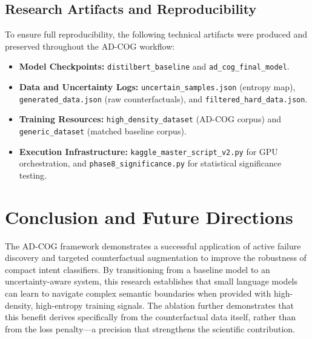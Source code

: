 \documentclass[11pt,a4paper]{article}
\begin{document}
\subsection{Research Artifacts and Reproducibility}
To ensure full reproducibility, the following technical artifacts were produced and preserved throughout the AD-COG workflow:
\begin{itemize}
    \item \textbf{Model Checkpoints:} \texttt{distilbert\_baseline} and \texttt{ad\_cog\_final\_model}.
    \item \textbf{Data and Uncertainty Logs:} \texttt{uncertain\_samples.json} (entropy map), \texttt{generated\_data.json} (raw counterfactuals), and \texttt{filtered\_hard\_data.json}.
    \item \textbf{Training Resources:} \texttt{high\_density\_dataset} (AD-COG corpus) and \texttt{generic\_dataset} (matched baseline corpus).
    \item \textbf{Execution Infrastructure:} \texttt{kaggle\_master\_script\_v2.py} for GPU orchestration, and \texttt{phase8\_significance.py} for statistical significance testing.
\end{itemize}

\section{Conclusion and Future Directions}

The AD-COG framework demonstrates a successful application of active failure discovery and targeted counterfactual augmentation to improve the robustness of compact intent classifiers. By transitioning from a baseline model to an uncertainty-aware system, this research establishes that small language models can learn to navigate complex semantic boundaries when provided with high-density, high-entropy training signals. The ablation further demonstrates that this benefit derives specifically from the counterfactual data itself, rather than from the loss penalty—a precision that strengthens the scientific contribution.
\end{document}
